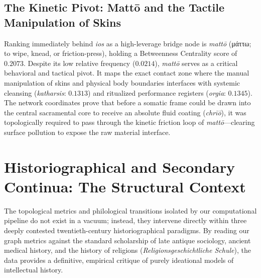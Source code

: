 \documentclass[11pt,twoside,a4paper]{article}
\begin{document}
\subsection{The Kinetic Pivot: Mattō and the Tactile Manipulation of Skins}
Ranking immediately behind \textit{ios} as a high-leverage bridge node is \textit{mattō} (\textgreek{μάττω}; to wipe, knead, or friction-press), holding a Betweenness Centrality score of $0.2073$. Despite its low relative frequency ($0.0214$), \textit{mattō} serves as a critical behavioral and tactical pivot.
It maps the exact contact zone where the manual manipulation of skins and physical body boundaries interfaces with systemic cleansing (\textit{katharsis}: $0.1313$) and ritualized performance registers (\textit{orgia}: $0.1345$). The network coordinates prove that before a somatic frame could be drawn into the central sacramental core to receive an absolute fluid coating (\textit{chrīō}), it was topologically required to pass through the kinetic friction loop of \textit{mattō}—clearing surface pollution to expose the raw material interface.

\section{Historiographical and Secondary Continua: The Structural Context}
The topological metrics and philological transitions isolated by our computational pipeline do not exist in a vacuum; instead, they intervene directly within three deeply contested twentieth-century historiographical paradigms. By reading our graph metrics against the standard scholarship of late antique sociology, ancient medical history, and the history of religions (\textit{Religionsgeschichtliche Schule}), the data provides a definitive, empirical critique of purely ideational models of intellectual history.
\end{document}
